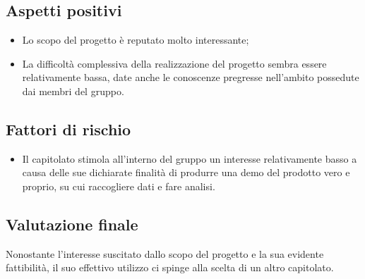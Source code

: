 \documentclass[openany,12pt,a4paper]{report}
\begin{document}
	\subsection{Aspetti positivi}

	\begin{itemize}
		\item Lo scopo del progetto è reputato molto interessante;

		\item La difficoltà complessiva della realizzazione del progetto sembra essere relativamente bassa, date anche le conoscenze pregresse nell'ambito possedute dai membri del gruppo.
	\end{itemize}

	\subsection{Fattori di rischio}

	\begin{itemize}
		\item Il capitolato stimola all'interno del gruppo un interesse relativamente basso a causa delle sue dichiarate finalità di produrre una demo del prodotto vero e proprio, su cui raccogliere dati e fare analisi.
	\end{itemize}

	\subsection{Valutazione finale}

	Nonostante l'interesse suscitato dallo scopo del progetto e la sua evidente fattibilità, il suo effettivo utilizzo ci spinge alla scelta di un altro capitolato.
\end{document}
